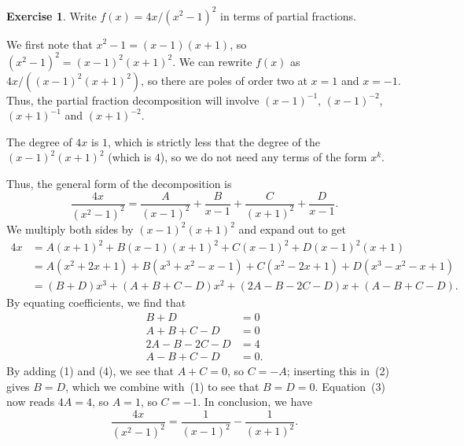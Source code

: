 \documentclass[a4paper]{book}
\theoremstyle{definition}
\newtheorem{exercise}[theorem]{Exercise}
\renewenvironment{solution}{\SolutionInline}{\endSolutionInline}
\begin{document}
\begin{exercise}
 Write $f(x)=4x/(x^2-1)^2$ in terms of partial fractions.
\end{exercise}
\begin{solution}
 We first note that $x^2-1=(x-1)(x+1)$, so $(x^2-1)^2=(x-1)^2(x+1)^2$.
 We can rewrite $f(x)$ as $4x/((x-1)^2(x+1)^2)$, so there are poles of
 order two at $x=1$ and $x=-1$.  Thus, the partial fraction
 decomposition will involve $(x-1)^{-1}$, $(x-1)^{-2}$, $(x+1)^{-1}$
 and $(x+1)^{-2}$.
 
 The degree of $4x$ is $1$, which is strictly less that the degree of
 the $(x-1)^2(x+1)^2$ (which is $4$), so we do not need any terms of
 the form $x^k$.

 Thus, the general form of the decomposition is
 \[ \frac{4x}{(x^2-1)^2} = \frac{A}{(x-1)^2} + \frac{B}{x-1} + 
                           \frac{C}{(x+1)^2} + \frac{D}{x-1}.
 \]
 We multiply both sides by $(x-1)^2(x+1)^2$ and expand out to get
 \begin{align*}
  4x &= A(x+1)^2 + B(x-1)(x+1)^2 + C(x-1)^2 + D(x-1)^2(x+1) \\
     &= A(x^2+2x+1) + B(x^3+x^2-x-1) + C(x^2-2x+1) + D(x^3-x^2-x+1) \\
     &= (B+D)x^3 + (A+B+C-D)x^2 + (2A-B-2C-D)x + (A-B+C-D).
 \end{align*}
 By equating coefficients, we find that
 \begin{align*}
  B+D &= 0       \tag{1}\\
  A+B+C-D &= 0   \tag{2}\\
  2A-B-2C-D &= 4 \tag{3}\\
  A-B+C-D &= 0.  \tag{4}
 \end{align*}
 By adding (1) and (4), we see that $A+C=0$, so $C=-A$; inserting this
 in~(2) gives $B=D$, which we combine with~(1) to see that $B=D=0$.
 Equation~(3) now reads $4A=4$, so $A=1$, so $C=-1$.  In conclusion,
 we have
 \[ \frac{4x}{(x^2-1)^2} = \frac{1}{(x-1)^2} -
                           \frac{1}{(x+1)^2}. 
 \]
\end{solution}
\end{document}
